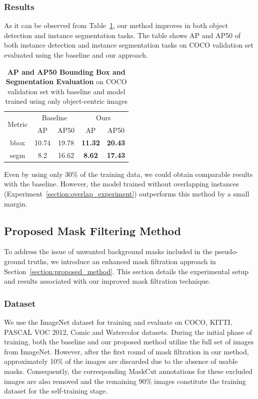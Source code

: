 \subsubsection{Results}
As it can be observed from Table~\ref{tab:object-centric-analysis}, our method improves in both object detection and instance segmentation tasks. The table shows AP and AP50 of both instance detection and instance segmentation tasks on COCO validation set evaluated using the baseline and our approach.
\begin{table}[htbp]
	\centering
	\begin{tabular}{c|cc|cc}
		\toprule
		\multirow{2}{*}{Metric} & \multicolumn{2}{c|}{Baseline} & \multicolumn{2}{c}{Ours} \\ \cmidrule{2-5}
		& AP & AP50 & AP & AP50 \\ \midrule
		bbox & 10.74 & 19.78 & \textbf{11.32} & \textbf{20.43} \\
		\midrule
		segm & 8.2 & 16.62 & \textbf{8.62} & \textbf{17.43} \\
		\bottomrule
	\end{tabular}
	\caption[\textbf{Evaluation of Baseline vs Model Trained With Only Object-Centric Images}]{\textbf{AP and AP50 Bounding Box and Segmentation Evaluation} on COCO validation set with baseline and model trained using only object-centric images}
	\label{tab:object-centric-analysis}
\end{table}
Even by using only 30\% of the training data, we could obtain comparable results with the baseline. However, the model trained without overlapping instances (Experiment~\ref{section:overlap_experiment}) outperforms this method by a small margin.

\subsection{Proposed Mask Filtering Method}
\label{section:mask_refinement_experiment}
To address the issue of unwanted background masks included in the pseudo-ground truths, we introduce an enhanced mask filtration approach in Section~\ref{section:proposed_method}. This section details the experimental setup and results associated with our improved mask filtration technique.

\subsubsection{Dataset}
We use the ImageNet dataset for training and evaluate on COCO, KITTI, PASCAL VOC 2012, Comic and Watercolor datasets. During the initial phase of training, both the baseline and our proposed method utilize the full set of images from ImageNet. However, after the first round of mask filtration in our method, approximately 10\% of the images are discarded due to the absence of usable masks. Consequently, the corresponding MaskCut annotations for these excluded images are also removed and the remaining 90\% images constitute the training dataset for the self-training stage.

